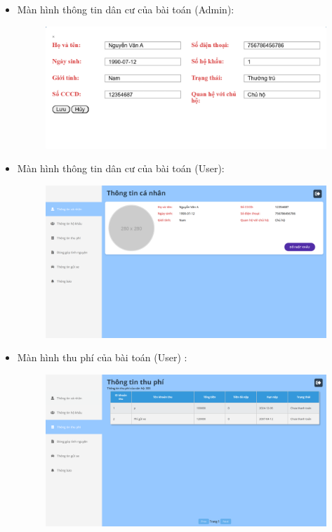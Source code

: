 \documentclass{article}
\begin{document}
\begin{itemize}
\begin{figure}[H]
    \end{figure}
    \newpage
    \item Màn hình thông tin dân cư của bài toán (Admin):
    \begin{figure}[H]
        \centering
        \includegraphics[width=1\textwidth]{Ảnh chương 4/Chi tiết nhân khẩu 1.png}
    \end{figure}
    \item Màn hình thông tin dân cư của bài toán (User):
    \begin{figure}[H]
        \centering
        \includegraphics[width=1\textwidth]{Ảnh chương 4/Cư dân 2.png}
    \end{figure}
    \newpage
    \item Màn hình thu phí của bài toán (User) :
    \begin{figure}[H]
        \centering
        \includegraphics[width=1\textwidth]{Ảnh chương 4/Thu phí 2.png}

\end{figure}
\end{itemize}
\end{document}
